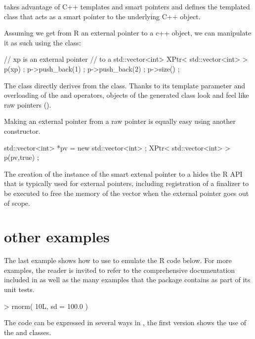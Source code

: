  takes advantage of C++ templates and smart pointers and 
defines the templated class  that acts as a smart 
pointer to the underlying C++ object. 

Assuming we get from R an external pointer to a 
c++ object, we can manipulate it as such using the  class:

\begin{example}
// xp is an external pointer 
// to a std::vector<int>
XPtr< std::vector<int> > p(xp) ;
p->push\_back(1) ;
p->push\_back(2) ;
p->size() ; 
\end{example}

The  class directly derives from the  class.
Thanks to its template parameter and overloading of the \code{->} 
and \code{*} operators, objects of the  generated
class look and feel like raw pointers ().

Making an external pointer from a raw pointer is equally easy using 
another constructor. 

\begin{example}
std::vector<int> *pv = new std::vector<int> ;
XPtr< std::vector<int> > p(pv,true) ;
\end{example}

The creation of the instance of the  
smart extenal pointer to a  hides the 
R API that is typically used for external pointers, including registration
of a finalizer to be executed to free the memory of the vector when the
external pointer goes out of scope. 

\section{other examples}

The last example shows how to use  to emulate the R code below.
For more examples, the reader is invited to 
refer to the comprehensive documentation included in 
as well as the many examples that the package contains as part of 
its unit tests. 

\begin{example}
> rnorm( 10L, sd = 100.0 )
\end{example}

The code can be expressed in several ways in , the first version
shows the use of the  and  classes. 

